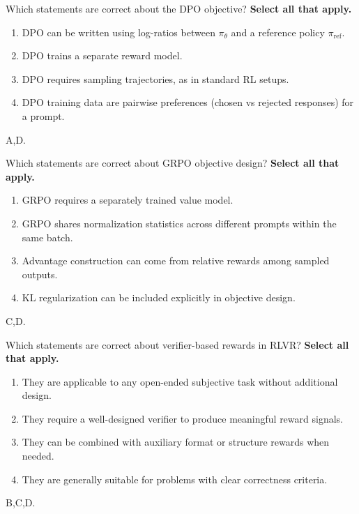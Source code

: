 
\question[4]
Which statements are correct about the DPO objective? \textbf{Select all that apply.}
\begin{enumerate}
\item DPO can be written using log-ratios between $\pi_\theta$ and a reference policy $\pi_{\mathrm{ref}}$. 
\item DPO trains a separate reward model. 
\item DPO requires sampling trajectories, as in standard RL setups.
\item DPO training data are pairwise preferences (chosen vs rejected responses) for a prompt. 
\end{enumerate}
\begin{soln}
A,D.
\end{soln}

\question[4]
Which statements are correct about GRPO objective design?
\textbf{Select all that apply.}
\begin{enumerate}
\item GRPO requires a separately trained value model.
\item GRPO shares normalization statistics across different prompts within the same batch.
\item Advantage construction can come from relative rewards among sampled outputs.
\item KL regularization can be included explicitly in objective design.
\end{enumerate}
\begin{soln}
C,D.
\end{soln}

\question[4]
  Which statements are correct about verifier-based rewards in RLVR?
\textbf{Select all that apply.}
\begin{enumerate}
\item They are applicable to any open-ended subjective task without additional design.
\item They require a well-designed verifier to produce meaningful reward signals.
\item They can be combined with auxiliary format or structure rewards when needed.
\item They are generally suitable for problems with clear correctness criteria.
\end{enumerate}
\begin{soln}
B,C,D.
\end{soln}

